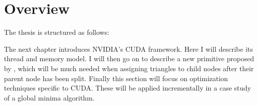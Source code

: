 


\section{Overview}

The thesis is structured as follows:




The next chapter introduces NVIDIA's CUDA framework. Here I will describe its
thread and memory model. I will then go on to describe a new primitive proposed
by \sengupta{}, which will be much needed when assigning triangles to child
nodes after their parent node has been split. Finally this section will focus on
optimization techniques specific to CUDA. These will be applied incrementally in
a case study of a global minima algorithm.


